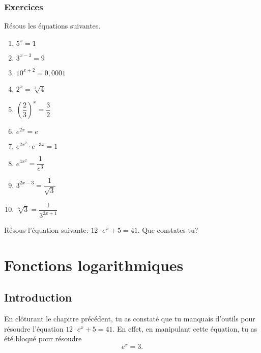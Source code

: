 \documentclass[a4paper,12pt,singlepage]{report}
\begin{document}
\subsection{Exercices}
\label{sec:org77164a8}
\begin{exercice}
Résous les équations suivantes.

\par \setlength{\columnseprule}{0 pt}
          \begin{minipage}[t]{\linewidth}
          \begin{multicols}{3}

\begin{enumerate}
\item \(5^x=1\)
\item \(3^{x-3}=9\)
\item \(10^{x+2}=0,0001\)
\item \(2^x=\sqrt[3]{4}\)
\item \(\left(\dfrac{2}{3}\right)^x=\dfrac{3}{2}\)
\item \(e^{2x}=e\)
\item \(e^{2x^2}\cdot e^{-3x}=1\)
\item \(e^{4x^2}=\dfrac{1}{e^3}\)
\item \(3^{2x-3}=\dfrac{1}{\sqrt{3}}\)
\item \(\sqrt[5]{3}=\dfrac{1}{3^{2x+1}}\)
\end{enumerate}



\end{multicols}\end{minipage}
\end{exercice}

\begin{exercice}
Résous l'équation suivante: \(12\cdot e^{x}+5=41\). Que constates-tu?
\end{exercice}

\chapter{Fonctions logarithmiques}
\label{sec:org8bb23e6}
\section{Introduction}
\label{sec:org27046aa}
En clôturant le chapitre précédent, tu as constaté que tu manquais d'outils pour
résoudre l'équation \(12\cdot e^{x}+5=41\). En effet, en manipulant cette
équation, tu as été bloqué pour résoudre
\[
e^x=3.
\]
\end{document}
